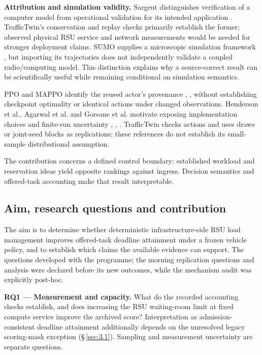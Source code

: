 \documentclass[11pt,a4paper]{article}
\begin{document}
\textbf{Attribution and simulation validity.} Sargent distinguishes verification of a computer model from operational validation for its intended application \cite{ref12}. TrafficTwin's conservation and replay checks primarily establish the former; observed physical RSU service and network measurements would be needed for stronger deployment claims. SUMO supplies a microscopic simulation framework \cite{ref8}, but importing its trajectories does not independently validate a coupled radio/computing model. This distinction explains why a source-correct result can be scientifically useful while remaining conditional on simulation semantics.

PPO and MAPPO identify the reused actor's provenance \cite{ref3}, \cite{ref4}, without establishing checkpoint optimality or identical actions under changed observations. Henderson et al., Agarwal et al. and Gorsane et al. motivate exposing implementation choices and finite-run uncertainty \cite{ref5}, \cite{ref6}, \cite{ref7}. TrafficTwin checks actions and uses draws or joint-seed blocks as replications; these references do not establish its small-sample distributional assumption.

The contribution concerns a defined control boundary: established workload and reservation ideas yield opposite rankings against ingress. Decision semantics and offered-task accounting make that result interpretable.

\subsection{Aim, research questions and contribution}\label{sec:1.3}

The aim is to determine whether deterministic infrastructure-side RSU load management improves offered-task deadline attainment under a frozen vehicle policy, and to establish which claims the available evidence can support. The questions developed with the programme; the morning replication questions and analysis were declared before its new outcomes, while the mechanism audit was explicitly post-hoc.

\textbf{RQ1 --- Measurement and capacity.} What do the recorded accounting checks establish, and does increasing the RSU waiting-room limit at fixed compute service improve the archived score? Interpretation as admission-consistent deadline attainment additionally depends on the unresolved legacy scoring-mask exception (\S\,\ref{sec:3.1}). Sampling and measurement uncertainty are separate questions.
\end{document}

